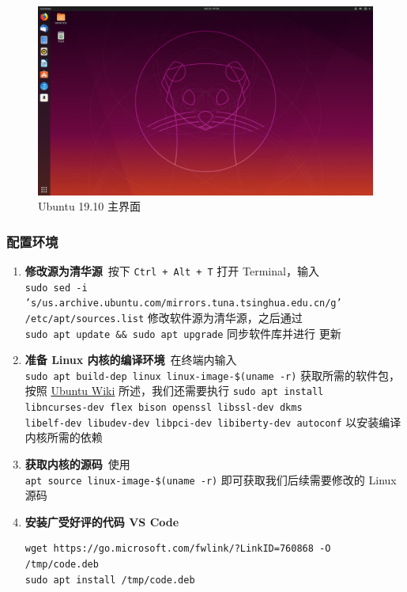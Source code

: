 \documentclass[blue,normal,cn]{elegantnote}
\newcommand{\code}[1]{\colorbox{light-gray}{\texttt{#1}}}
\begin{document}
\begin{enumerate}
  \begin{figure}[!htbp]
    \centering
    \includegraphics[width=.8\textwidth]{fig/lab-1/fig2-5}
    \caption{Ubuntu 19.10 主界面}
    \label{fig:UbuntuMain}
  \end{figure}
\end{enumerate}

\subsubsection{配置环境}
\begin{enumerate}
  \item \textbf{修改源为清华源}\ 按下 \code{Ctrl + Alt + T} 
  打开 Terminal，输入 \\
  \code{sudo sed -i 's/us.archive.ubuntu.com/mirrors.tuna.tsinghua.edu.cn/g'} \\
  \code{/etc/apt/sources.list}
  修改软件源为清华源，之后通过 \\
  \code{sudo apt update \&\& sudo apt upgrade} 同步软件库并进行
  更新
  \item \textbf{准备 Linux 内核的编译环境}\ 在终端内输入 \\
  \code{sudo apt build-dep linux linux-image-\$(uname -r)}
  获取所需的软件包，按照 \href{https://wiki.ubuntu.com/Kernel/BuildYourOwnKernel#Build_Environment}{Ubuntu Wiki}
  所述，我们还需要执行 \code{sudo apt install} \\
  \code{libncurses-dev flex bison openssl libssl-dev dkms} \\
  \code{libelf-dev libudev-dev libpci-dev libiberty-dev autoconf}
  以安装编译内核所需的依赖
  \item \textbf{获取内核的源码}\ 使用 \\
  \code{apt source linux-image-\$(uname -r)} 
  即可获取我们后续需要修改的 Linux 源码
  \item \textbf{安装广受好评的代码 VS Code}
  \begin{lstlisting}
wget https://go.microsoft.com/fwlink/?LinkID=760868 -O /tmp/code.deb
sudo apt install /tmp/code.deb
  \end{lstlisting}
\end{enumerate}
\end{document}
